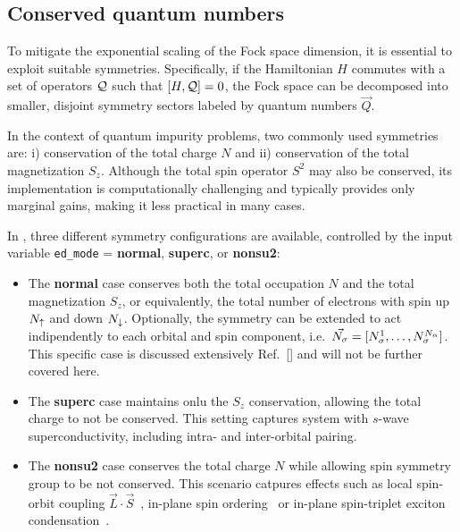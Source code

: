 \documentclass[edipack2.tex]{subfiles}
\begin{document}
\subsection{Conserved quantum numbers}\label{sSecQNs}
To mitigate the exponential scaling of the Fock space dimension, it 
is essential to exploit suitable symmetries. Specifically, if the 
Hamiltonian $H$ commutes with a set of operators ${\cal Q}$ such that 
$[H, {\cal Q}] = 0$, the Fock space can be decomposed into smaller, 
disjoint symmetry sectors labeled by quantum numbers $\vec{Q}$.

In the context of quantum impurity problems, two commonly used 
symmetries are: i) conservation of the total charge $N$ and ii) 
conservation of the total magnetization $S_z$. Although the total 
spin operator $S^2$ may also be conserved, its implementation is 
computationally challenging and typically provides only marginal 
gains, making it less practical in many cases.

In \NAME, three different symmetry configurations are available, 
controlled by the input variable {\tt ed\_mode} = {\bf normal}, 
{\bf superc}, or {\bf nonsu2}:

\begin{itemize}
\item{} The {\bf normal} case conserves both the total occupation $N$
and the total magnetization $S_z$, or equivalently, the total number
of electrons with spin up $N_\uparrow$ and down $N_\downarrow$.
Optionally, the symmetry
can be extended to act indipendently to each orbital and spin
component, i.e.~$\vec{N_\sigma}=[N^1_\sigma,\dots,N^{N_\alpha}_\sigma]$. This
specific case is discussed extensively
Ref.~[] and will not be further covered here.

%

\item{} The {\bf superc} case maintains onlu the $S_z$ conservation,
allowing the total charge to not be conserved. This setting captures
system with $s$-wave superconductivity, including 
intra- and inter-orbital pairing.

\item{} The {\bf nonsu2} case conserves the total
charge $N$ while allowing spin symmetry group to be not conserved.
This scenario catpures effects such as local spin-orbit coupling
$\vec{L}\cdot\vec{S}$~\cite{something}, in-plane spin ordering~\cite{BellomiaKMH} or
in-plane spin-triplet exciton condensation~\cite{Amaricci2023_excitons,Blason}.  
\end{itemize}
\end{document}

